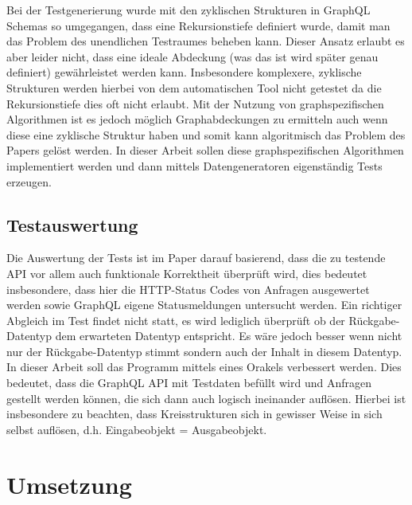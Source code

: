 Bei der Testgenerierung wurde mit den zyklischen Strukturen in GraphQL Schemas so
umgegangen, dass eine Rekursionstiefe definiert wurde, damit man das Problem des unendlichen Testraumes beheben kann.
Dieser Ansatz erlaubt es aber leider nicht, dass eine ideale Abdeckung (was das ist wird später genau
definiert) gewährleistet werden kann.
Insbesondere komplexere, zyklische Strukturen werden hierbei von dem automatischen
Tool nicht getestet da die Rekursionstiefe dies oft nicht erlaubt.
Mit der Nutzung von graphspezifischen Algorithmen ist es jedoch möglich Graphabdeckungen zu ermitteln auch wenn diese
eine zyklische Struktur haben und somit kann algoritmisch das Problem des Papers gelöst werden.
In dieser Arbeit sollen diese graphspezifischen Algorithmen implementiert werden und dann mittels Datengeneratoren eigenständig
Tests erzeugen.

\subsection{Testauswertung}

Die Auswertung der Tests ist im Paper darauf basierend, dass die zu testende API vor allem auch funktionale Korrektheit überprüft wird,
dies bedeutet insbesondere, dass hier die HTTP-Status Codes von Anfragen ausgewertet werden sowie GraphQL eigene Statusmeldungen untersucht werden.
Ein richtiger Abgleich im Test findet nicht statt, es wird lediglich überprüft ob der Rückgabe-Datentyp dem erwarteten Datentyp entspricht.
Es wäre jedoch besser wenn nicht nur der Rückgabe-Datentyp stimmt sondern auch der Inhalt in diesem Datentyp. In dieser Arbeit
soll das Programm mittels eines Orakels verbessert werden. Dies bedeutet, dass die GraphQL API mit Testdaten befüllt wird und Anfragen
gestellt werden können, die sich dann auch logisch ineinander auflösen. Hierbei ist insbesondere zu beachten, dass Kreisstrukturen sich in gewisser Weise
in sich selbst auflösen, d.h. Eingabeobjekt = Ausgabeobjekt.

\section{Umsetzung}

